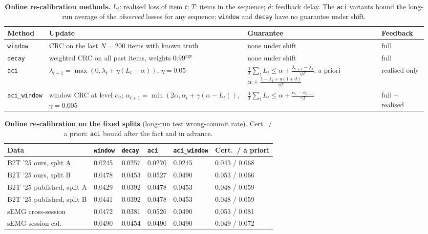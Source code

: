 \begin{table}[H]
  \centering
  \caption{\textbf{Online re-calibration methods.} $L_t$: realised loss of item $t$; $T$: items in the sequence; $d$: feedback delay. The \texttt{aci} variants bound the long-run average of the \emph{observed} losses for any sequence; \texttt{window} and \texttt{decay} have no guarantee under shift.}
  \label{tab:online}
  \small
  \begin{adjustbox}{max width=\linewidth}\begin{tabular}{@{}llll@{}}
    \toprule
    \textbf{Method} & \textbf{Update} & \textbf{Guarantee} & \textbf{Feedback} \\
    \midrule
    \texttt{window} & CRC on the last $N = 200$ items with known truth & none under shift & full \\
    \texttt{decay} & weighted CRC on all past items, weights $0.99^{\text{age}}$ & none under shift & full \\
    \texttt{aci} & $\lambda_{t+1} = \max(0, \lambda_t + \eta(L_t - \alpha))$, $\eta = 0.05$ \citep{gibbs2021aci,angelopoulos2023pid,feldman2023rolling} & $\frac1T\sum_t L_t \le \alpha + \frac{\lambda_{T+1} - \lambda_1}{\eta T}$; a priori $\alpha + \frac{1 - \lambda_1 + \eta(1+d)}{\eta T}$ & realised only \\
    \texttt{aci\_window} & window CRC at level $\alpha_t$; $\alpha_{t+1} = \min(2\alpha, \alpha_t + \gamma(\alpha - L_t))$, $\gamma = 0.005$ & $\frac1T\sum_t L_t \le \alpha + \frac{\alpha_1 - \alpha_{T+1}}{\gamma T}$ & full + realised \\
    \bottomrule
  \end{tabular}\end{adjustbox}
\end{table}

\begin{table}[H]
  \centering
  \caption{\textbf{Online re-calibration on the fixed splits} (long-run test wrong-commit rate). Cert.\ / a priori: \texttt{aci} bound after the fact and in advance.}
  \label{tab:online-results}
  \small
  \begin{tabular}{@{}llllll@{}}
    \toprule
    \textbf{Data} & \texttt{window} & \texttt{decay} & \texttt{aci} & \texttt{aci\_window} & \textbf{Cert.\ / a priori} \\
    \midrule
    B2T '25 ours, split A & 0.0245 & 0.0257 & 0.0270 & 0.0245 & 0.043 / 0.068 \\
    B2T '25 ours, split B & 0.0478 & 0.0453 & 0.0527 & 0.0490 & 0.053 / 0.066 \\
    B2T '25 published, split A & 0.0429 & 0.0392 & 0.0478 & 0.0453 & 0.048 / 0.059 \\
    B2T '25 published, split B & 0.0441 & 0.0392 & 0.0478 & 0.0453 & 0.048 / 0.059 \\
    sEMG cross-session & 0.0472 & 0.0381 & 0.0526 & 0.0490 & 0.053 / 0.081 \\
    sEMG session-cal. & 0.0490 & 0.0454 & 0.0490 & 0.0490 & 0.049 / 0.072 \\
    \bottomrule
  \end{tabular}
\end{table}

